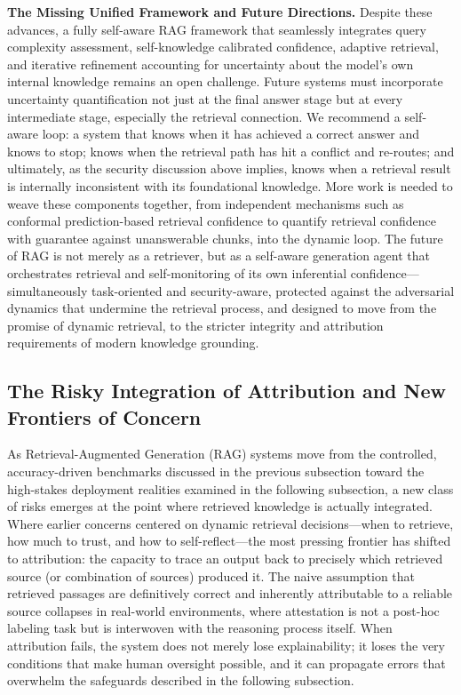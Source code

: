 \documentclass[11pt]{article}
\begin{document}
\textbf{The Missing Unified Framework and Future Directions.} Despite these advances, a fully self-aware RAG framework that seamlessly integrates query complexity assessment, self-knowledge calibrated confidence, adaptive retrieval, and iterative refinement accounting for uncertainty about the model's own internal knowledge remains an open challenge. Future systems must incorporate uncertainty quantification not just at the final answer stage but at every intermediate stage, especially the retrieval connection. We recommend a self-aware loop: a system that knows when it has achieved a correct answer and knows to stop; knows when the retrieval path has hit a conflict and re-routes; and ultimately, as the security discussion above implies, knows when a retrieval result is internally inconsistent with its foundational knowledge. More work is needed to weave these components together, from independent mechanisms such as conformal prediction-based retrieval confidence \cite{ref47} to quantify retrieval confidence with guarantee against unanswerable chunks, into the dynamic loop. The future of RAG is not merely as a retriever, but as a self-aware generation agent that orchestrates retrieval and self-monitoring of its own inferential confidence---simultaneously task-oriented and security-aware, protected against the adversarial dynamics that undermine the retrieval process, and designed to move from the promise of dynamic retrieval, to the stricter integrity and attribution requirements of modern knowledge grounding.

\subsection{The Risky Integration of Attribution and New Frontiers of Concern}

As Retrieval-Augmented Generation (RAG) systems move from the controlled, accuracy-driven benchmarks discussed in the previous subsection toward the high-stakes deployment realities examined in the following subsection, a new class of risks emerges at the point where retrieved knowledge is actually integrated. Where earlier concerns centered on dynamic retrieval decisions---when to retrieve, how much to trust, and how to self-reflect---the most pressing frontier has shifted to attribution: the capacity to trace an output back to precisely which retrieved source (or combination of sources) produced it. The naive assumption that retrieved passages are definitively correct and inherently attributable to a reliable source collapses in real-world environments, where attestation is not a post-hoc labeling task but is interwoven with the reasoning process itself. When attribution fails, the system does not merely lose explainability; it loses the very conditions that make human oversight possible, and it can propagate errors that overwhelm the safeguards described in the following subsection.
\end{document}
